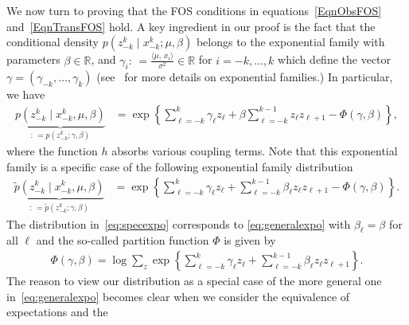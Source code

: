 \documentclass[twoside,11pt]{article}
\newcommand{\inprod}[2]{\ensuremath{\langle #1 , \, #2 \rangle}}
\newcommand{\generalp}{\tilde{p}}
\newcommand{\paramobs}{\mu}
\newcommand{\paramtrans}{\beta}
\newcommand{\paramgamma}{\gamma}
\newcommand{\expcum}{\Phi}
\newcommand{\real}{\ensuremath{\mathbb{R}}}
\newcommand{\defn}{: \, = }
\newcommand{\kdim}{\ensuremath{k}}
\begin{document}
We now turn to proving that the FOS conditions in
equations~\eqref{EqnObsFOS} and~\eqref{EqnTransFOS} hold.  A key
ingredient in our proof is the fact that the conditional density
$p(z_{-\kdim}^\kdim \mid x_{-\kdim}^\kdim; \paramobs, \paramtrans)$
belongs to the exponential family with parameters $\paramtrans \in
\real$, and $\paramgamma_i \defn \frac{\inprod{\mu}{x_i}}{\sigma^2}
\in \real$ for $i=-k, \ldots, \kdim$ which define the vector
$\paramgamma = (\gamma_{-k}, \dots, \gamma_k)$ (see~\cite{WaiJor08}
for more details on exponential families.)  In particular, we have
\begin{align}
\label{eq:specexpo}
\underbrace{p(z_{-k}^k \mid x_{-k}^k,\paramobs, \paramtrans)}_{ \defn
  p(z_{-k}^k; \paramgamma, \paramtrans)} & = \exp \left\{
\sum_{\ell=-k}^k \paramgamma_{\ell} z_{\ell} + \paramtrans \sum_{\ell =
  -k}^{k-1} z_{\ell}z_{\ell+1} - \expcum(\paramgamma, \paramtrans)
\right\},
\end{align} 
where the function $h$ absorbs various coupling terms.
Note that this exponential family is a specific case of the following
exponential family distribution
\begin{align}
\label{eq:generalexpo}
\underbrace{\generalp (z_{-k}^k \mid x_{-k}^k,\paramobs, \paramtrans)}_{ \defn
  \generalp(z_{-k}^k; \paramgamma, \paramtrans)} & = \exp \left\{
\sum_{\ell=-k}^k \paramgamma_{\ell} z_{\ell} +  \sum_{\ell =
  -k}^{k-1} \paramtrans_{\ell} z_{\ell}z_{\ell+1} - \expcum(\paramgamma, \paramtrans)
\right\}.
\end{align} 
The distribution in~\eqref{eq:specexpo} corresponds to 
\eqref{eq:generalexpo} 
with $\paramtrans_\ell = \paramtrans$ for all $\ell$
 and the
so-called partition function $\expcum$ is given by
\begin{align*}
\expcum (\gamma, \paramtrans) = \log \sum_z \exp \left\{ \sum_{\ell=-k}^k
\paramgamma_{\ell} z_{\ell} + 
\sum_{\ell=-k}^{k-1} \paramtrans_{\ell} z_{\ell}
z_{\ell+1} \right\}.
\end{align*}
The reason to view our distribution as a special case of the more
general one in~\eqref{eq:generalexpo} becomes clear when 
we consider the equivalence of expectations and the 
\end{document}
